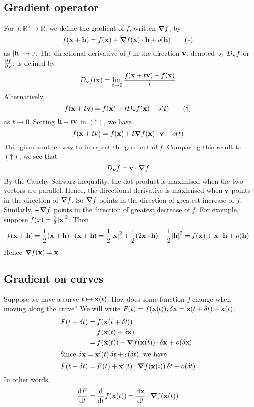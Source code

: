 \subsection{Gradient operator}
For \(f \colon \mathbb R^3 \to \mathbb R\), we define the gradient of \(f\), written \(\grad f\), by
\begin{equation}
	f(\vb x + \vb h) = f(\vb x) + \grad f(\vb x) \cdot \vb h + o(\vb h)
	\tag{\(\ast\)}
\end{equation}
as \(\abs{\vb h} \to 0\).
The directional derivative of \(f\) in the direction \(\vb v\), denoted by \(D_{\vb v} f\) or \(\frac{\partial f}{\partial \vb v}\), is defined by
\[
	D_{\vb v} f(\vb x) = \lim_{t \to 0} \frac{f(\vb x + t\vb v) - f(\vb x)}{t}
\]
Alternatively,
\begin{equation}
	f(\vb x + t\vb v) = f(\vb x) + t D_{\vb v}f(\vb x) + o(t)
	\tag{\(\dagger\)}
\end{equation}
as \(t \to 0\).
Setting \(\vb h = t\vb v\) in \((\ast)\), we have
\[
	f(\vb x + t\vb v) = f(\vb x) + t \grad f(\vb x) \cdot \vb v + o(t)
\]
This gives another way to interpret the gradient of \(f\).
Comparing this result to \((\dagger)\), we see that
\[
	D_{\vb v} f = \vb v \cdot \grad f
\]
By the Cauchy-Schwarz inequality, the dot product is maximised when the two vectors are parallel.
Hence, the directional derivative is maximised when \(\vb v\) points in the direction of \(\grad f\).
So \(\grad f\) points in the direction of greatest increase of \(f\).
Similarly, \(-\grad f\) points in the direction of greatest decrease of \(f\).
For example, suppose \(f(x) = \frac{1}{2}\abs{\vb x}^2\).
Then
\[
	f(\vb x + \vb h) = \frac{1}{2}(\vb x + \vb h)\cdot (\vb x + \vb h) = \frac{1}{2}\abs{\vb x}^2 + \frac{1}{2}(2\vb x \cdot \vb h) + \frac{1}{2}\abs{\vb h}^2 = f(\vb x) + \vb x \cdot \vb h + o(\vb h)
\]
Hence \(\grad f(\vb x) = \vb x\).

\subsection{Gradient on curves}
Suppose we have a curve \(t \mapsto \vb x(t)\).
How does some function \(f\) change when moving along the curve?
We will write \(F(t) = f(\vb x(t)), \delta \vb x = \vb x(t + \delta t) - \vb x(t)\).
\begin{align*}
	F(t + \delta t) & = f(\vb x(t + \delta t))                                               \\
	                & = f(\vb x(t) + \delta \vb x)                                           \\
	                & = f(\vb x(t)) + \grad f(\vb x(t)) \cdot \delta \vb x + o(\delta \vb x) \\
	\intertext{Since \(\delta \vb x = \vb x'(t) \,\delta t + o(\delta t)\), we have}
	F(t + \delta t) & = F(t) + \vb x'(t) \cdot \grad f(\vb x(t)) \,\delta t + o(\delta t)
\end{align*}
In other words,
\[
	\frac{\dd{F}}{\dd{t}} = \frac{\dd}{\dd{t}}f(\vb x(t)) = \frac{\dd \vb x}{\dd{t}} \cdot \grad f(\vb x(t))
\]

